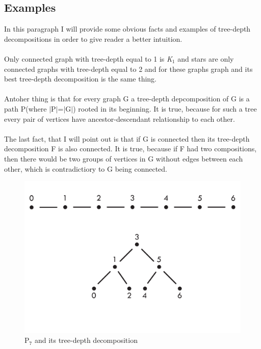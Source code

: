 \subsection{Examples}
In this paragraph I will provide some obvious facts and examples of tree-depth decompositions in order to give reader a better intuition.\\\\
Only connected graph with tree-depth equal to 1 is \emph{K$_{1}$} and stars are only connected graphs with tree-depth equal to 2 and for these graphs graph and its best tree-depth decomposition is the same thing.\\\\
Antoher thing is that for every graph G a tree-depth depcomposition of G is a path P(where $|$P$|$=$|$G$|$) rooted in its beginning. It is true, because for such a tree every pair of vertices have ancestor-descendant relationship to each other.\\\\
The last fact, that I will point out is that if G is connected then its tree-depth decomposition F is also connected. It is true, because if F had two compositions, then there would be two groups of vertices in G without edges between each other, which is contradictiory to G being connected.
\begin{figure}[hbt!]
	\centering
	\includegraphics[scale=0.5,valign=t]{sciezka.pdf}
	\caption{P$_{7}$ and its tree-depth decomposition}
\end{figure}
\\\\\\\\
